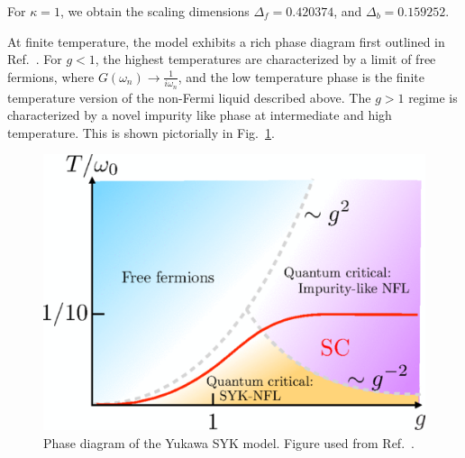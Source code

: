 \par
For $\kappa = 1$, we obtain the scaling dimensions $\Delta_f = 0.420374$, and $\Delta_b = 0.159252$.
\par 
At finite temperature, the model exhibits a rich phase diagram first outlined in Ref.~\cite{esterlis2019cooper}. For $g<1$, the highest temperatures are characterized by a limit of free fermions, where $G(\omega_n) \rightarrow \frac{1}{i\omega_n}$, and the low temperature phase is the finite temperature version of the non-Fermi liquid described above. The $g>1$ regime is characterized by a novel impurity like phase at intermediate and high temperature. This is shown pictorially in Fig.~\ref{fig:ESPhaseDiagram}.
\begin{figure}
    \centering
    \includegraphics[width=0.7\linewidth]{figures/introduction/ESphasediag.png}
    \caption{Phase diagram of the Yukawa SYK model. Figure used from Ref.~\cite{esterlis2019cooper}.}
    \label{fig:ESPhaseDiagram}
\end{figure}


